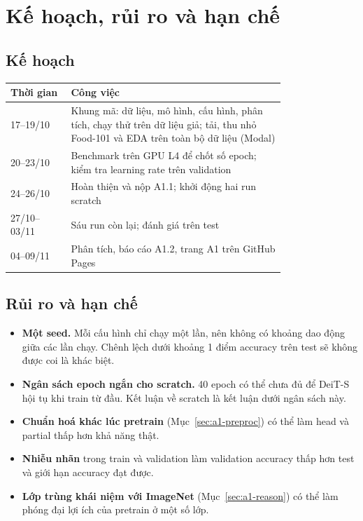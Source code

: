 \section{Kế hoạch, rủi ro và hạn chế}\label{sec:a1-plan}
\subsection{Kế hoạch}
\begin{center}
\small
\begin{tabular}{lp{0.78\linewidth}}
\toprule
Thời gian & Công việc \\
\midrule
17--19/10 & Khung mã: dữ liệu, mô hình, cấu hình, phân tích, chạy thử trên dữ liệu giả; tải, thu nhỏ Food-101 và EDA trên toàn bộ dữ liệu (Modal) \\
20--23/10 & Benchmark trên GPU L4 để chốt số epoch; kiểm tra learning rate trên validation \\
24--26/10 & Hoàn thiện và nộp A1.1; khởi động hai run scratch \\
27/10--03/11 & Sáu run còn lại; đánh giá trên test \\
04--09/11 & Phân tích, báo cáo A1.2, trang A1 trên GitHub Pages \\
\bottomrule
\end{tabular}
\end{center}

\subsection{Rủi ro và hạn chế}\label{sec:a1-risk}
\begin{itemize}
\item \textbf{Một seed.} Mỗi cấu hình chỉ chạy một lần, nên không có khoảng dao động giữa các lần chạy. Chênh lệch dưới khoảng 1 điểm accuracy trên test sẽ không được coi là khác biệt.
\item \textbf{Ngân sách epoch ngắn cho scratch.} 40 epoch có thể chưa đủ để DeiT-S hội tụ khi train từ đầu. Kết luận về scratch là kết luận dưới ngân sách này.
\item \textbf{Chuẩn hoá khác lúc pretrain} (Mục~\ref{sec:a1-preproc}) có thể làm head và partial thấp hơn khả năng thật.
\item \textbf{Nhiễu nhãn} trong train và validation làm validation accuracy thấp hơn test và giới hạn accuracy đạt được.
\item \textbf{Lớp trùng khái niệm với ImageNet} (Mục~\ref{sec:a1-reason}) có thể làm phóng đại lợi ích của pretrain ở một số lớp.
\end{itemize}

